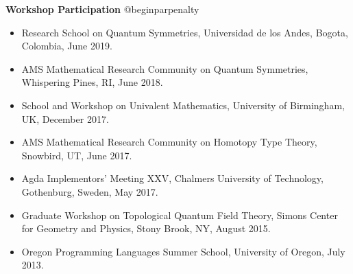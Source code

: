 \documentclass[11pt]{article}
\begin{document}
  
  {\large \textbf{Workshop Participation}}
  \csname @beginparpenalty
  \begin{itemize}
    \item[] Research School on Quantum Symmetries, Universidad de los Andes, Bogota, Colombia, June 2019.
    
    \item[] AMS Mathematical Research Community on Quantum Symmetries, Whispering Pines, RI, June 2018.

    \item[] School and Workshop on Univalent Mathematics, University of Birmingham, UK, December 2017.
    
    \item[] AMS Mathematical Research Community on Homotopy Type Theory, Snowbird, UT, June 2017.

    \item[] Agda Implementors' Meeting XXV, Chalmers University of Technology, Gothenburg, Sweden, May 2017.
      
    \item[] Graduate Workshop on Topological Quantum Field Theory, Simons Center for Geometry and Physics, Stony Brook, NY, August 2015.

    \item[] Oregon Programming Languages Summer School, University of Oregon, July 2013.
  \end{itemize}

  
  
  
\end{document}
